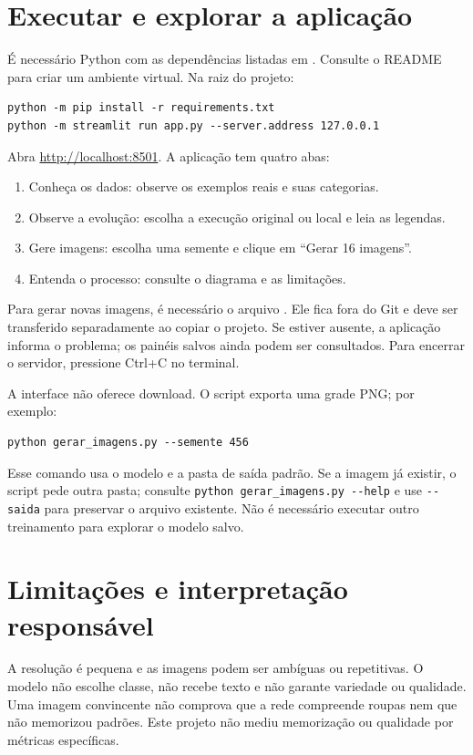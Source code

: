 \documentclass[12pt,a4paper]{article}
\begin{document}
\section{Executar e explorar a aplicação}
É necessário Python com as dependências listadas em . Consulte o README para criar um ambiente virtual. Na raiz do projeto:
\begin{verbatim}
python -m pip install -r requirements.txt
python -m streamlit run app.py --server.address 127.0.0.1
\end{verbatim}
Abra \url{http://localhost:8501}. A aplicação tem quatro abas:
\begin{enumerate}
\item Conheça os dados: observe os exemplos reais e suas categorias.
\item Observe a evolução: escolha a execução original ou local e leia as legendas.
\item Gere imagens: escolha uma semente e clique em ``Gerar 16 imagens''.
\item Entenda o processo: consulte o diagrama e as limitações.
\end{enumerate}
Para gerar novas imagens, é necessário o arquivo . Ele fica fora do Git e deve ser transferido separadamente ao copiar o projeto. Se estiver ausente, a aplicação informa o problema; os painéis salvos ainda podem ser consultados. Para encerrar o servidor, pressione Ctrl+C no terminal.

A interface não oferece download. O script  exporta uma grade PNG; por exemplo:
\begin{verbatim}
python gerar_imagens.py --semente 456
\end{verbatim}
Esse comando usa o modelo e a pasta de saída padrão. Se a imagem já existir, o script pede outra pasta; consulte \verb|python gerar_imagens.py --help| e use \verb|--saida| para preservar o arquivo existente. Não é necessário executar outro treinamento para explorar o modelo salvo.

\section{Limitações e interpretação responsável}
A resolução é pequena e as imagens podem ser ambíguas ou repetitivas. O modelo não escolhe classe, não recebe texto e não garante variedade ou qualidade. Uma imagem convincente não comprova que a rede compreende roupas nem que não memorizou padrões. Este projeto não mediu memorização ou qualidade por métricas específicas.
\end{document}
